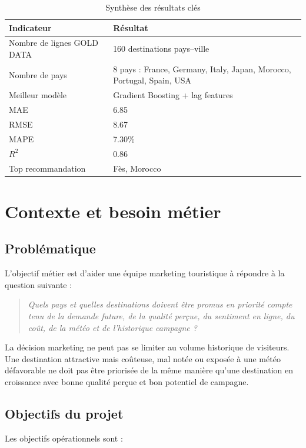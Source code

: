 \documentclass[11pt,a4paper]{report}
\begin{document}
\begin{table}[H]
\centering
\caption{Synthèse des résultats clés}
\begin{tabularx}{\textwidth}{lX}
\toprule
\textbf{Indicateur} & \textbf{Résultat} \\
\midrule
Nombre de lignes GOLD DATA & 160 destinations pays--ville \\
Nombre de pays & 8 pays : France, Germany, Italy, Japan, Morocco, Portugal, Spain, USA \\
Meilleur modèle & Gradient Boosting + lag features \\
MAE & 6.85 \\
RMSE & 8.67 \\
MAPE & 7.30\% \\
$R^2$ & 0.86 \\
Top recommandation & Fès, Morocco \\
\bottomrule
\end{tabularx}
\end{table}

\chapter{Contexte et besoin métier}

\section{Problématique}

L'objectif métier est d'aider une équipe marketing touristique à répondre à la question suivante :

\begin{quote}
\textit{Quels pays et quelles destinations doivent être promus en priorité compte tenu de la demande future, de la qualité perçue, du sentiment en ligne, du coût, de la météo et de l'historique campagne ?}
\end{quote}

La décision marketing ne peut pas se limiter au volume historique de visiteurs. Une destination attractive mais coûteuse, mal notée ou exposée à une météo défavorable ne doit pas être priorisée de la même manière qu'une destination en croissance avec bonne qualité perçue et bon potentiel de campagne.

\section{Objectifs du projet}

Les objectifs opérationnels sont :
\end{document}
